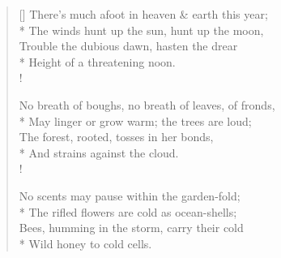 \documentclass[MAIN]{subfiles}
\begin{document}
\settowidth{\versewidth}{There's much afoot in heaven \& earth this year;}
\begin{verse}[\versewidth]
There's much afoot in heaven \& earth this year;\\*
\vin The winds hunt up the sun, hunt up the moon,\\
Trouble the dubious dawn, hasten the drear\\*
\vin Height of a threatening noon.\\!

No breath of boughs, no breath of leaves, of fronds,\\*
\vin May linger or grow warm; the trees are loud;\\
The forest, rooted, tosses in her bonds,\\*
\vin And strains against the cloud.\\!

No scents may pause within the garden-fold;\\*
\vin The rifled flowers are cold as ocean-shells;\\
Bees, humming in the storm, carry their cold\\*
\vin Wild honey to cold cells.
\end{verse}
\end{document}
